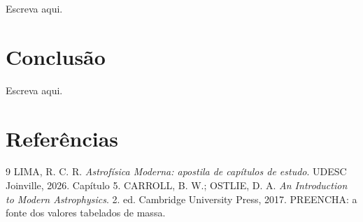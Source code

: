 \documentclass[10pt,a4paper,twocolumn]{article}
\begin{document}
Escreva aqui.

\section{Conclusão}

Escreva aqui.

\section*{Referências}

\begin{thebibliography}{9}\footnotesize
{} LIMA, R. C. R. \emph{Astrofísica Moderna: apostila de
capítulos de estudo}. UDESC Joinville, 2026. Capítulo 5.
 CARROLL, B. W.; OSTLIE, D. A. \emph{An Introduction to Modern
Astrophysics}. 2. ed. Cambridge University Press, 2017.
 PREENCHA: a fonte dos valores tabelados de massa.
\end{thebibliography}
\end{document}
